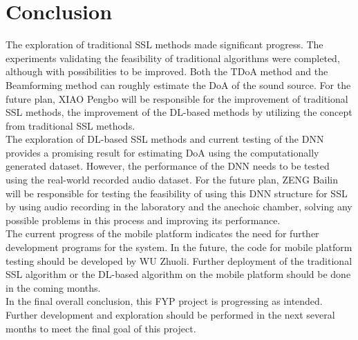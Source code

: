 \chapter*{Conclusion}


The exploration of traditional SSL methods made significant progress. The experiments validating the feasibility of traditional algorithms were completed, although with possibilities to be improved. Both the TDoA method and the Beamforming method can roughly estimate the DoA of the sound source. For the future plan, XIAO Pengbo will be responsible for the improvement of traditional SSL methods, the improvement of the DL-based methods by utilizing the concept from traditional SSL methods.\\
The exploration of DL-based SSL methods and current testing of the DNN provides a promising result for estimating DoA using the computationally generated dataset. However, the performance of the DNN needs to be tested using the real-world recorded audio dataset. For the future plan, ZENG Bailin will be responsible for testing the feasibility of using this DNN structure for SSL by using audio recording in the laboratory and the anechoic chamber, solving any possible problems in this process and improving its performance.\\
The current progress of the mobile platform indicates the need for further development programs for the system. In the future, the code for mobile platform testing should be developed by WU Zhuoli. Further deployment of the traditional SSL algorithm or the DL-based algorithm on the mobile platform should be done in the coming months.\\
In the final overall conclusion, this FYP project is progressing as intended. Further development and exploration should be performed in the next several months to meet the final goal of this project.